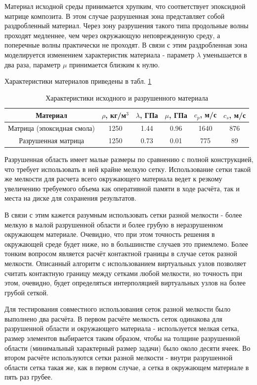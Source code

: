 Материал исходной среды принимается хрупким, что соответствует эпоксидной матрице композита. В этом случае разрушенная зона представляет собой раздробленный материал. Через зону разрушения такого типа продольные волны проходят медленнее, чем через окружающую неповрежденную среду, а поперечные волны практически не проходят. В связи с этим раздробленная зона моделируется изменением характеристик материала - параметр $\lambda$ уменьшается в два раза, параметр $\mu$ принимается близким к нулю. 

Характеристики материалов приведены в табл. \ref{tbl:crack}
\begin{table}[h]
\centering
\caption{Характеристики исходного и разрушенного материала}
\begin{tabular}{|c|c|c|c|c|c|}
\hline
Материал & $\rho$, кг/м$^{3}$ & $\lambda$, ГПа & $\mu$, ГПа &
$c_p$, м/с & $c_s$, м/с \\
\hline
Матрица (эпоксидная смола) & 1250 & 1.44 & 0.96 & 1640 & 876 \\
Разрушенная матрица & 1250 & 0.73 & 0.01 & 775 & 89 \\
\hline
\end{tabular}
\label{tbl:crack}
\end{table}

Разрушенная область имеет малые размеры по сравнению с полной конструкцией, что требует использовать в ней крайне мелкую сетку. Использование сетки такой же мелкости для расчета всего окружающего материала ведет к резкому увеличению требуемого объема как оперативной памяти в ходе расчёта, так и места на диске для сохранения результатов.

В связи с этим кажется разумным использовать сетки разной мелкости - более мелкую в малой разрушенной области и более грубую в неразрушенном окружающем материале. Очевидно, что при этом точность решения в окружающей среде будет ниже, но в большинстве случаев это приемлемо. Более тонким вопросом является расчёт контактной границы в случае сеток разной мелкости. Описанный алгоритм с использованием виртуальных узлов позволяет считать контактную границу между сетками любой мелкости, но точность при этом, очевидно, будет определяться интерполяцией виртуальных узлов на более грубой сеткой.

Для тестирования совместного использования сеток разной мелкости было выполнено два расчёта. В первом расчёте мелкость сеток одинакова для разрушенной области и окружающего материала - используется мелкая сетка, размер элементов выбирается таким образом, чтобы на толщине разрушенной области (минимальный характерный размер задачи) было около десяти ячеек. Во втором расчёте используются сетки разной мелкости - внутри разрушенной области сетка такая же, как в первом случае, а сетка в окружающем материале в пять раз грубее.

